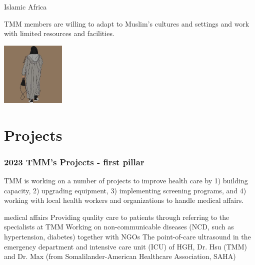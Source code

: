 \documentclass[aspectratio=169]{beamer}
\begin{document}
\begin{frame}{Islamic Africa}

\begin{outline}
    \1 TMM members are willing to adapt to Muslim's cultures and settings and work with limited resources and facilities.

\end{outline}

\begin{center}
\includegraphics[width=0.23\textwidth]{IMG_4872.jpeg}


%
%
\end{center}

\end{frame}
\section{Projects}
\begin{frame}
\frametitle{2023 TMM's Projects - first pillar}
\begin{outline}
    TMM is working on a number of projects to improve health care by 1) building capacity, 2) upgrading equipment, 3) implementing screening programs, and 4) working with local health workers and organizations to handle medical affairs.
    
    \1 medical affairs
        \2 Providing quality care to patients through referring to the specialists at TMM
        \2 Working on non-communicable diseases (NCD, such as hypertension, diabetes) together with NGOs
        \2 The point-of-care ultrasound in the emergency department and intensive care unit (ICU) of HGH, Dr. Hsu (TMM) and Dr. Max (from Somalilander-American Healthcare Association, SAHA)

\end{outline}



\end{frame}
\end{document}
